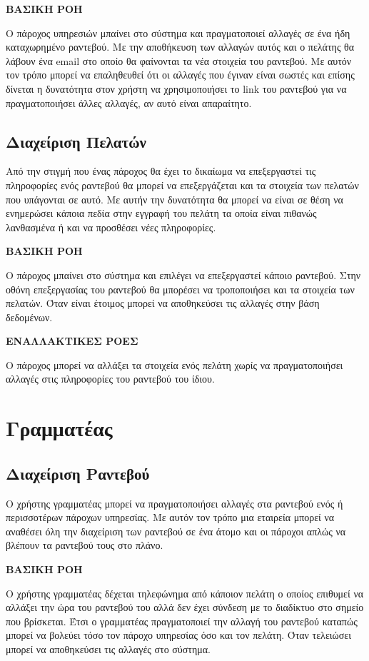 \textbf{ΒΑΣΙΚΗ ΡΟΗ}

Ο πάροχος υπηρεσιών μπαίνει στο σύστημα και πραγματοποιεί αλλαγές σε ένα ήδη καταχωρημένο ραντεβού. Με την αποθήκευση των αλλαγών αυτός και ο πελάτης θα λάβουν ένα email στο οποίο θα φαίνονται τα νέα στοιχεία του ραντεβού. Με αυτόν τον τρόπο μπορεί να επαληθευθεί ότι οι αλλαγές που έγιναν είναι σωστές και επίσης δίνεται η δυνατότητα στον χρήστη να χρησιμοποιήσει το link του ραντεβού για να πραγματοποιήσει άλλες αλλαγές, αν αυτό είναι απαραίτητο.

\subsection {Διαχείριση Πελατών}
Από την στιγμή που ένας πάροχος θα έχει το δικαίωμα να επεξεργαστεί τις πληροφορίες ενός ραντεβού θα μπορεί να επεξεργάζεται και τα στοιχεία των πελατών που υπάγονται σε αυτό. Με αυτήν την δυνατότητα θα μπορεί να είναι σε θέση να ενημερώσει κάποια πεδία στην εγγραφή του πελάτη τα οποία είναι πιθανώς λανθασμένα ή και να προσθέσει νέες πληροφορίες.

\textbf{ΒΑΣΙΚΗ ΡΟΗ}

Ο πάροχος μπαίνει στο σύστημα και επιλέγει να επεξεργαστεί κάποιο ραντεβού. Στην οθόνη επεξεργασίας του ραντεβού θα μπορέσει να τροποποιήσει και τα στοιχεία των πελατών. Όταν είναι έτοιμος μπορεί να αποθηκεύσει τις αλλαγές στην βάση δεδομένων.

\textbf{ΕΝΑΛΛΑΚΤΙΚΕΣ ΡΟΕΣ}

Ο πάροχος μπορεί να αλλάξει τα στοιχεία ενός πελάτη χωρίς να πραγματοποιήσει αλλαγές στις πληροφορίες του ραντεβού του ίδιου.

\section{Γραμματέας}
\subsection{Διαχείριση Ραντεβού}
Ο χρήστης γραμματέας μπορεί να πραγματοποιήσει αλλαγές στα ραντεβού ενός ή περισσοτέρων πάροχων υπηρεσίας. Με αυτόν τον τρόπο μια εταιρεία μπορεί να αναθέσει όλη την διαχείριση των ραντεβού σε ένα άτομο και οι πάροχοι απλώς να βλέπουν τα ραντεβού τους στο πλάνο.

\textbf{ΒΑΣΙΚΗ ΡΟΗ}

Ο χρήστης γραμματέας δέχεται τηλεφώνημα από κάποιον πελάτη ο οποίος επιθυμεί να αλλάξει την ώρα του ραντεβού του αλλά δεν έχει σύνδεση με το διαδίκτυο στο σημείο που βρίσκεται. Έτσι ο γραμματέας πραγματοποιεί την αλλαγή του ραντεβού καταπώς μπορεί να βολεύει τόσο τον πάροχο υπηρεσίας όσο και τον πελάτη. Όταν τελειώσει μπορεί να αποθηκεύσει τις αλλαγές στο σύστημα.

